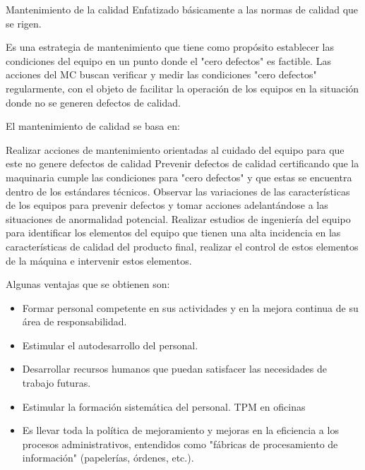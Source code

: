 \documentclass[./pmain.tex]{subfiles}
\begin{document}
\begin{frame}{Mantenimiento de la calidad}
Enfatizado básicamente a las normas de calidad que se rigen.

Es una estrategia de mantenimiento que tiene como propósito establecer las condiciones del equipo en un punto donde el "cero defectos" es factible. Las acciones del MC buscan verificar y medir las condiciones "cero defectos" regularmente, con el objeto de facilitar la operación de los equipos en la situación donde no se generen defectos de calidad.
\end{frame}
\begin{frame}{El mantenimiento de calidad se basa en:}

Realizar acciones de mantenimiento orientadas al cuidado del equipo para que este no genere defectos de calidad
Prevenir defectos de calidad certificando que la maquinaria cumple las condiciones para "cero defectos" y que estas se encuentra dentro de los estándares técnicos.
Observar las variaciones de las características de los equipos para prevenir defectos y tomar acciones adelantándose a las situaciones de anormalidad potencial.
Realizar estudios de ingeniería del equipo para identificar los elementos del equipo que tienen una alta incidencia en las características de calidad del producto final, realizar el control de estos elementos de la máquina e intervenir estos elementos.
\end{frame}
\begin{frame}{Algunas ventajas que se obtienen son:}
\begin{itemize}
    \item Formar personal competente en sus actividades y en la mejora continua de su área de responsabilidad.
\item Estimular el autodesarrollo del personal.
\item Desarrollar recursos humanos que puedan satisfacer las necesidades de trabajo futuras.
\item Estimular la formación sistemática del personal.
TPM en oficinas
\item Es llevar toda la política de mejoramiento y mejoras en la eficiencia a los procesos administrativos, entendidos como "fábricas de procesamiento de información" (papelerías, órdenes, etc.).
\end{itemize}
\end{frame}
\end{document}
